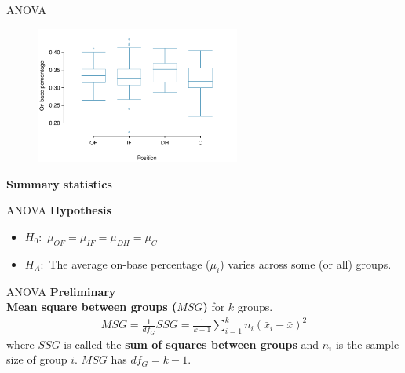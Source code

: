 \documentclass[12pt,a4paper]{beamer}
\begin{document}
\begin{frame}{ANOVA}
	\begin{figure}
	\centering
	\includegraphics[width=0.6\textwidth]{figures/mlbANOVA/mlbANOVABoxPlot}
	\end{figure}
	\textbf{Summary statistics}
	\begin{table}[ht]
	\centering
	\end{table}
\end{frame}
\begin{frame}{ANOVA}
	\textbf{Hypothesis}
	\begin{itemize}
	\setlength{\itemsep}{0mm}
	\item $H_0:$ $\mu_{OF} = \mu_{IF} = \mu_{DH} = \mu_{C}$
	\item $H_A:$ The average on-base percentage ($\mu_i$) varies across some (or all) groups.
	\end{itemize}
\end{frame}
\begin{frame}{ANOVA}
	\textbf{Preliminary}\\
		\textbf{Mean square between groups ($MSG$)} for $k$ groups.
		\begin{align*}
		MSG = \frac{1}{df_{G}}SSG = \frac{1}{k-1}\sum_{i=1}^{k} n_{i}\left(\bar{x}_{i} - \bar{x}\right)^2
		\end{align*}
		where $SSG$ is called the \textbf{sum of squares between groups} and $n_{i}$ is the sample size of group $i$. $MSG$ has $df_{G}=k-1$.
\end{frame}
\end{document}

